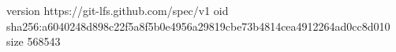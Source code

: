 version https://git-lfs.github.com/spec/v1
oid sha256:a6040248d898c22f5a8f5b0e4956a29819cbe73b4814cea4912264ad0cc8d010
size 568543
